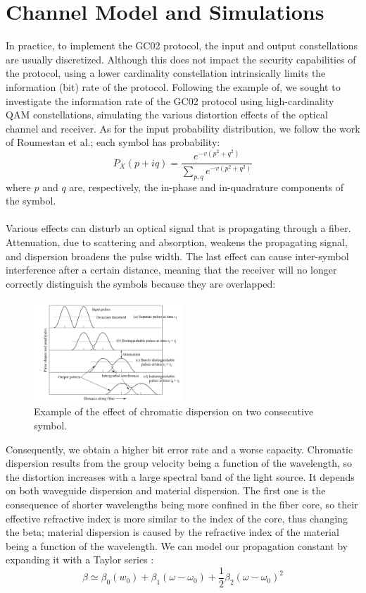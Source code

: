 \documentclass[journal, letterpaper]{IEEEtran}
\begin{document}
\section{Channel Model and Simulations}
In practice, to implement the GC02 protocol, the input and output constellations are usually discretized. Although this does not impact the security capabilities of the protocol\cite{Ghorai}, using a lower cardinality constellation intrinsically limits the information (bit) rate of the protocol. Following the example of\cite{Roumenstan}, we sought to investigate the information rate of the GC02 protocol using high-cardinality QAM constellations, simulating the various distortion effects of the optical channel and receiver.
As for the input probability distribution, we follow the work of Roumestan et al.\cite{Roumenstan}; each symbol has probability:
\[P_X (p +iq) = \frac{e^{-v(p^2 + q^2)}}{\sum_{p,q} e^{-v(p^2 + q^2)}} \]
where $p$ and $q$ are, respectively, the in-phase and in-quadrature components of the symbol. \\
\\
Various effects can disturb an optical signal that is propagating through a fiber. Attenuation, due to scattering and absorption, weakens the propagating signal, and dispersion broadens the pulse width. The last effect can cause inter-symbol interference after a certain distance, meaning that the receiver will no longer correctly distinguish the symbols because they are overlapped:
\begin{figure}[!h]
    \centering
    \includegraphics[width=0.5\textwidth]{Images/dispersion_effect.png}
        \caption{Example of the effect of chromatic dispersion on two consecutive symbol\cite{keiser}.}
     \label{fig:quadtree}
\end{figure}
Consequently, we obtain a higher bit error rate and a worse capacity. Chromatic dispersion results from the group velocity being a function of the wavelength, so the distortion increases with a large spectral band of the light source. It depends on both waveguide dispersion and material dispersion. The first one is the consequence of shorter wavelengths being more confined in the fiber core, so their effective refractive index is more similar to the index of the core, thus changing the beta; material dispersion is caused by the refractive index of the material being a function of the wavelength. We can model our propagation constant by expanding it with a Taylor series \cite{keiser}:
\[\beta \simeq \beta_0(w_0) + \beta_{1}(\omega-\omega_0) + \frac{1}{2}\beta_2(\omega-\omega_0)^2\] 
\end{document}
